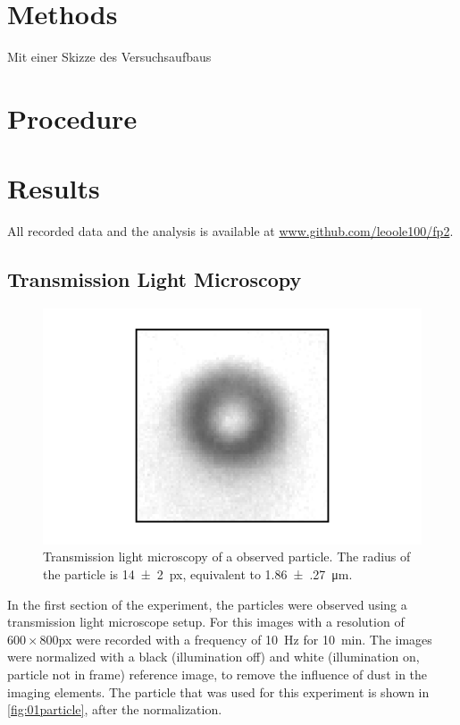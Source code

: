 \documentclass[
    parskip=half, 
    twoside=false,
    twocolumn=true,
    fontsize=11pt,
]{scrarticle}
\begin{document}
\section{Methods}
Mit einer Skizze des Versuchsaufbaus

\section{Procedure}

\section{Results}
All recorded data and the analysis is available at \url{www.github.com/leoole100/fp2}.

\pagebreak
\subsection{Transmission Light Microscopy}
\begin{figure}
    \centering
    \includegraphics{figures/01_01_1_particle.pdf}
    \caption{Transmission light microscopy of a observed particle. The radius of the particle is \SI{14(2)}{px}, equivalent to \SI{1.86(27)}{\micro m}.}
    \label{fig:01particle}
\end{figure}
In the first section of the experiment, the particles were observed using a transmission light microscope setup.
For this images with a resolution of $600\times 800$\si{px} were recorded with a frequency of \SI{10}{Hz} for \SI{10}{min}.
The images were normalized with a black (illumination off) and white (illumination on, particle not in frame) reference image, to remove the influence of dust in the imaging elements.
The particle that was used for this experiment is shown in \autoref{fig:01particle}, after the normalization.
\end{document}
